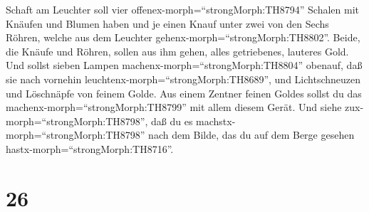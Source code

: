 Schaft am Leuchter soll vier offenex-morph=``strongMorph:TH8794''
Schalen mit Knäufen und Blumen haben  und je einen Knauf
unter zwei von den Sechs Röhren, welche aus dem Leuchter
gehenx-morph=``strongMorph:TH8802''.  Beide, die Knäufe und
Röhren, sollen aus ihm gehen, alles getriebenes, lauteres Gold.
 Und sollst sieben Lampen
machenx-morph=``strongMorph:TH8804'' obenauf, daß sie nach vornehin
leuchtenx-morph=``strongMorph:TH8689'',  und Lichtschneuzen
und Löschnäpfe von feinem Golde.  Aus einem Zentner feinen
Goldes sollst du das machenx-morph=``strongMorph:TH8799'' mit allem
diesem Gerät.  Und siehe zux-morph=``strongMorph:TH8798'',
daß du es machstx-morph=``strongMorph:TH8798'' nach dem Bilde, das du
auf dem Berge gesehen hastx-morph=``strongMorph:TH8716''.

\hypertarget{section-25}{%
\section{26}\label{section-25}}

